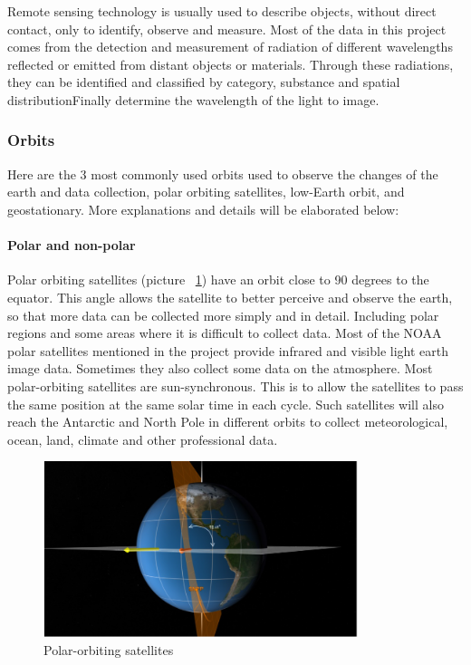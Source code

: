 \documentclass[conference]{IEEEtran}
\begin{document}
Remote sensing technology is usually used to describe objects, without direct contact, only to identify, observe and measure. Most of the data in this project comes from the detection and measurement of radiation of different wavelengths reflected or emitted from distant objects or materials. Through these radiations, they can be identified and classified by category, substance and spatial distribution\cite{earthdata28:online}Finally determine the wavelength of the light to image.

\subsubsection{Orbits} 
Here are the 3 most commonly used orbits used to observe the changes of the earth and data collection, polar orbiting satellites, low-Earth orbit, and geostationary. More explanations and details will be elaborated below:

\paragraph{Polar and non-polar}
    
Polar orbiting satellites (picture ~\ref{satellites}) have an orbit close to 90 degrees to the equator. This angle allows the satellite to better perceive and observe the earth, so that more data can be collected more simply and in detail. Including polar regions and some areas where it is difficult to collect data\cite{WhatisRe36:online}. Most of the NOAA polar satellites mentioned in the project provide infrared and visible light earth image data. Sometimes they also collect some data on the atmosphere\cite{side357:online}. Most polar-orbiting satellites are sun-synchronous. This is to allow the satellites to pass the same position at the same solar time in each cycle. Such satellites will also reach the Antarctic and North Pole in different orbits to collect meteorological, ocean, land, climate and other professional data.

\begin{figure}[htbp]
    \centerline{\includegraphics[width=260pt]{images/1.1.1.png}}
    \caption{Polar-orbiting satellites}
    \label{satellites}
\end{figure}
 
\end{document}
